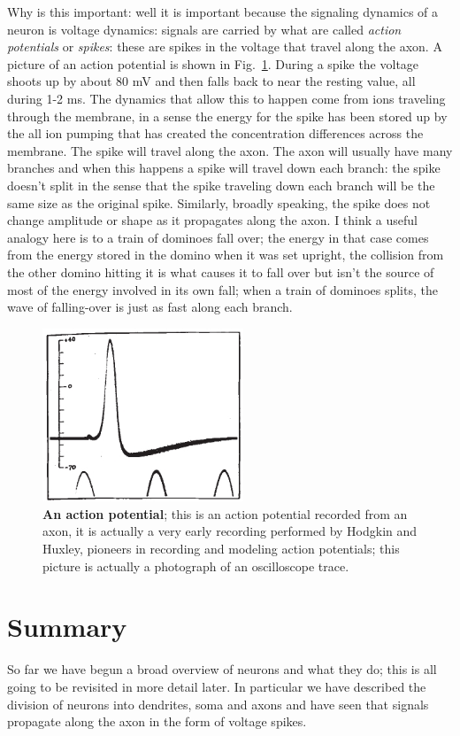 \documentclass[12pt]{article}
\begin{document}
Why is this important: well it is important because the signaling
dynamics of a neuron is voltage dynamics: signals are carried by what
are called \textsl{action potentials} or \textsl{spikes}: these are
spikes in the voltage that travel along the axon. A picture of an
action potential is shown in Fig.~\ref{fig_hh}. During a spike the
voltage shoots up by about 80 mV and then falls back to near the
resting value, all during 1-2 ms. The dynamics that allow this to
happen come from ions traveling through the membrane, in a sense the
energy for the spike has been stored up by the all ion pumping that
has created the concentration differences across the membrane. The
spike will travel along the axon. The axon will usually have many
branches and when this happens a spike will travel down each branch:
the spike doesn't split in the sense that the spike traveling down
each branch will be the same size as the original spike. Similarly,
broadly speaking, the spike does not change amplitude or shape as it
propagates along the axon. I think a useful analogy here is to a train
of dominoes fall over; the energy in that case comes from the energy
stored in the domino when it was set upright, the collision from the
other domino hitting it is what causes it to fall over but isn't the
source of most of the energy involved in its own fall; when a train of
dominoes splits, the wave of falling-over is just as fast along each
branch.


\begin{figure}[tbhp]
  \begin{center}
  \includegraphics[width=6cm]{action_potential.jpg}
\end{center}
  \caption{\textbf{An action potential}; this is an action potential recorded from an axon, it is actually a very early recording performed by Hodgkin and Huxley, pioneers in recording and modeling action potentials; this picture is actually a photograph of an oscilloscope trace. \label{fig_hh}}
\end{figure}

\section{Summary}

So far we have begun a broad overview of neurons and what they do;
this is all going to be revisited in more detail later. In particular
we have described the division of neurons into dendrites, soma and
axons and have seen that signals propagate along the axon in the form
of voltage spikes.
\end{document}
